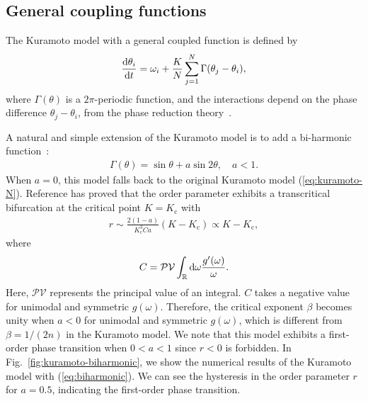 \subsection{General coupling functions}
The Kuramoto model with a general coupled function is defined by
\begin{align}
  \frac{\mathrm{d}\theta_{i}}{\mathrm{d} t}=\omega_{i}+\frac{K}{N}\sum_{j=1}^{N}\Gamma(\theta_{j}-\theta_{i}),
  \label{eq:phase-oscillator}
\end{align}
where $\Gamma(\theta)$ is a $2\pi$-periodic function,
and the interactions depend on the phase difference $\theta_{j}-\theta_{i}$,
from the phase reduction theory~\cite{kuramoto2019}.

A natural and simple extension of the Kuramoto model is to add a bi-harmonic function~\cite{komarov2014}:
\begin{align}
  \Gamma(\theta)=\sin\theta+a\sin2\theta,\quad a<1.
  \label{eq:biharmonic}
\end{align}
When $a=0$, this model falls back to the original Kuramoto model (\ref{eq:kuramoto-N}).
Reference \cite{chiba2011} has proved that the order parameter exhibits a transcritical bifurcation
at the critical point $K=K_{\mathrm{c}}$ with
\begin{align}
  r\sim\frac{2(1-a)}{K_{\mathrm{c}}^{3}Ca}(K-K_{\mathrm{c}})\propto K-K_{\mathrm{c}},
\end{align}
where
\begin{align}
  C=\mathcal{PV}\int_{\mathbb{R}}\mathrm{d}\omega\frac{g'(\omega)}{\omega}.
\end{align}
Here, $\mathcal{PV}$ represents the principal value of an integral.
$C$ takes a negative value for unimodal and symmetric $g(\omega)$.
Therefore, the critical exponent $\beta$ becomes unity when $a<0$
for unimodal and symmetric $g(\omega)$,
which is different from $\beta=1/(2n)$ in the Kuramoto model.
We note that this model exhibits a first-order phase transition when $0<a<1$
since $r<0$ is forbidden.
In Fig.~\ref{fig:kuramoto-biharmonic}, we show the numerical results of the Kuramoto model with (\ref{eq:biharmonic}).
We can see the hysteresis in the order parameter $r$ for $a=0.5$,
indicating the first-order phase transition.

